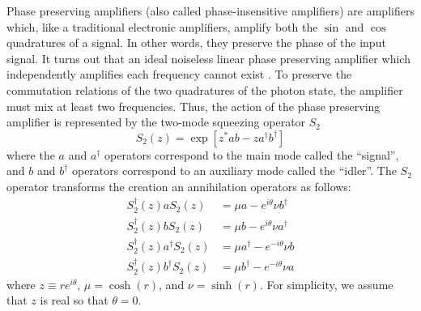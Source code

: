 Phase preserving amplifiers (also called phase-insensitive amplifiers) are amplifiers which, like a traditional electronic amplifiers, amplify both the $\sin$ and $\cos$ quadratures of a signal.
In other words, they preserve the phase of the input signal.
It turns out that an ideal noiseless linear phase preserving amplifier which independently amplifies each frequency cannot exist \cite{Caves:amplifiers1982}.
To preserve the commutation relations of the two quadratures of the photon state, the amplifier must mix at least two frequencies.
Thus, the action of the phase preserving amplifier is represented by the two-mode squeezing operator $S_2$
\begin{equation}
S_2(z) = \exp \left[ z^* a b - z a^\dagger b^\dagger \right] \end{equation}
where the $a$ and $a^{\dagger}$ operators correspond to the main mode called the ``signal'', and $b$ and $b^{\dagger}$ operators correspond to an auxiliary mode called the ``idler''.
The $S_2$ operator transforms the creation an annihilation operators as follows:
\begin{align}
S_2^\dagger(z) a S_2(z) &= \mu a - e^{i\theta} \nu b^\dagger \\
S_2^\dagger(z) b S_2(z) &= \mu b - e^{i\theta} \nu a^\dagger \\
S_2^\dagger(z) a^\dagger S_2(z) &= \mu a^\dagger - e^{-i\theta} \nu b \\
S_2^\dagger(z) b^\dagger S_2(z) &= \mu b^\dagger - e^{-i\theta} \nu a
\end{align}
where $z\equiv r e^{i \theta}$, $\mu = \cosh(r)$, and $\nu = \sinh(r)$.
For simplicity, we assume that $z$ is real so that $\theta=0$.

